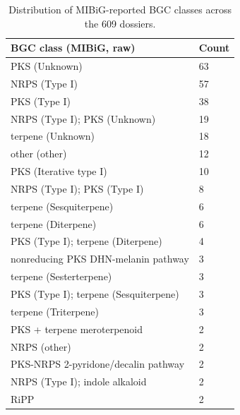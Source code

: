 \begin{table}[htbp]
\centering
\caption{Distribution of MIBiG-reported BGC classes across the 609 dossiers.}
\label{tab:bgcclass}
\begin{tabular}{l l}
\toprule
BGC class (MIBiG, raw) & Count \\
\midrule
PKS (Unknown) & 63 \\
NRPS (Type I) & 57 \\
PKS (Type I) & 38 \\
NRPS (Type I); PKS (Unknown) & 19 \\
terpene (Unknown) & 18 \\
other (other) & 12 \\
PKS (Iterative type I) & 10 \\
NRPS (Type I); PKS (Type I) & 8 \\
terpene (Sesquiterpene) & 6 \\
terpene (Diterpene) & 6 \\
PKS (Type I); terpene (Diterpene) & 4 \\
nonreducing PKS DHN-melanin pathway & 3 \\
terpene (Sesterterpene) & 3 \\
PKS (Type I); terpene (Sesquiterpene) & 3 \\
terpene (Triterpene) & 3 \\
PKS + terpene meroterpenoid & 2 \\
NRPS (other) & 2 \\
PKS-NRPS 2-pyridone/decalin pathway & 2 \\
NRPS (Type I); indole alkaloid & 2 \\
RiPP & 2 \\
\bottomrule
\end{tabular}
\end{table}